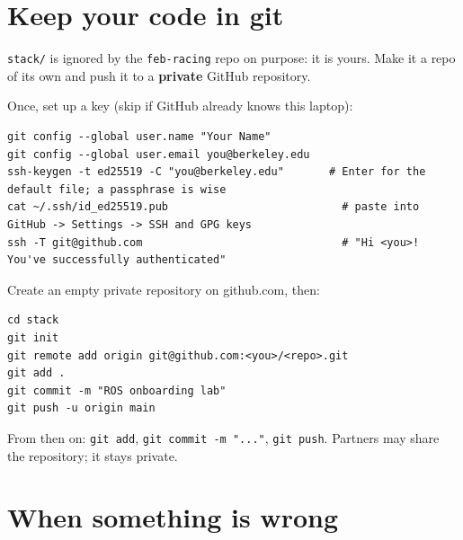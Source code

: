 \documentclass[11pt,a4paper]{article}
\begin{document}

\section{Keep your code in git}

\texttt{stack/} is ignored by the \texttt{feb-racing} repo on purpose: it is yours. Make it a
repo of its own and push it to a \textbf{private} GitHub repository.

Once, set up a key (skip if GitHub already knows this laptop):

\begin{lstlisting}
git config --global user.name "Your Name"
git config --global user.email you@berkeley.edu
ssh-keygen -t ed25519 -C "you@berkeley.edu"       # Enter for the default file; a passphrase is wise
cat ~/.ssh/id_ed25519.pub                           # paste into GitHub -> Settings -> SSH and GPG keys
ssh -T git@github.com                               # "Hi <you>! You've successfully authenticated"
\end{lstlisting}

Create an empty private repository on github.com, then:

\begin{lstlisting}
cd stack
git init
git remote add origin git@github.com:<you>/<repo>.git
git add .
git commit -m "ROS onboarding lab"
git push -u origin main
\end{lstlisting}

From then on: \texttt{git add}, \texttt{git commit -m "..."}, \texttt{git push}. Partners may
share the repository; it stays private.

\section{When something is wrong}
\end{document}
